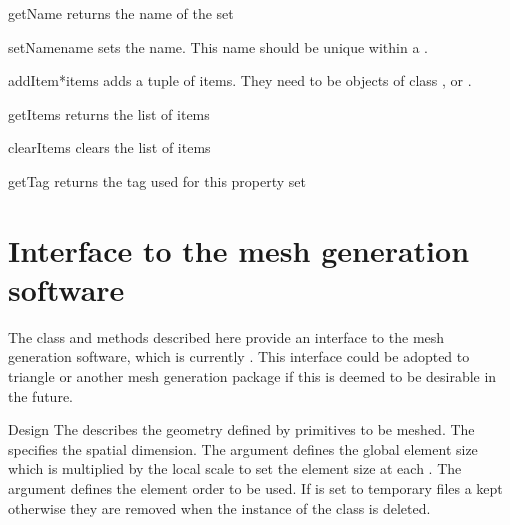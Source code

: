 \begin{methoddesc}[PropertySet]{getName}{}
returns the name of the set
\end{methoddesc}

\begin{methoddesc}[PropertySet]{setName}{name}
sets the name. This name should be unique within a \Design.
\end{methoddesc}

\begin{methoddesc}[PropertySet]{addItem}{*items}
adds a tuple of items. They need to be objects of class \ManifoldOneD, \ManifoldTwoD or \ManifoldThreeD. 
\end{methoddesc}

\begin{methoddesc}[PropertySet]{getItems}{}
returns the list of items
\end{methoddesc}

\begin{methoddesc}[PropertySet]{clearItems}{}
clears the list of items 
\end{methoddesc}

\begin{methoddesc}[PropertySet]{getTag}{}
returns the tag used for this property set
\end{methoddesc}

\section{Interface to the mesh generation software}

The class and methods described here provide an interface to the mesh
generation software, which is currently \gmshextern.  This interface could be
adopted to triangle or another mesh generation package if this is
deemed to be desirable in the future.

\begin{classdesc}{Design}{
}
The  describes the geometry defined by primitives to be meshed.
The  specifies the spatial dimension. The argument  defines the global
element size which is multiplied by the local scale to set the element size at each \Point. 
The argument  defines the element order to be used. If  is set to 
\True temporary files a kept otherwise they are removed when the instance of the class is deleted. 
\end{classdesc}


